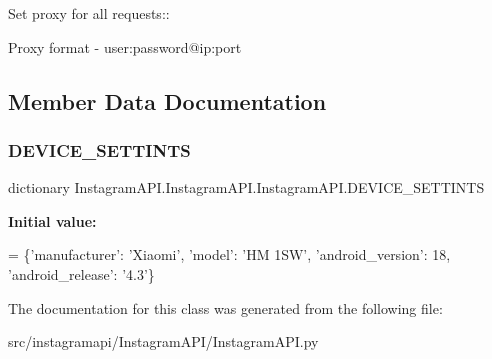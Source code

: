 \begin{DoxyVerb}Set proxy for all requests::

Proxy format - user:password@ip:port
\end{DoxyVerb}
 

\subsection{Member Data Documentation}
\mbox{\label{class_instagram_a_p_i_1_1_instagram_a_p_i_1_1_instagram_a_p_i_a79357d88350a65804fc06e2f5aed1765}} 
\subsubsection{\texorpdfstring{D\+E\+V\+I\+C\+E\+\_\+\+S\+E\+T\+T\+I\+N\+TS}{DEVICE\_SETTINTS}}
{\footnotesize\ttfamily dictionary Instagram\+A\+P\+I.\+Instagram\+A\+P\+I.\+Instagram\+A\+P\+I.\+D\+E\+V\+I\+C\+E\+\_\+\+S\+E\+T\+T\+I\+N\+TS\hspace{0.3cm}{\ttfamily [static]}}

{\bfseries Initial value\+:}
\begin{DoxyCode}
=  \{\textcolor{stringliteral}{'manufacturer'}: \textcolor{stringliteral}{'Xiaomi'},
                       \textcolor{stringliteral}{'model'}: \textcolor{stringliteral}{'HM 1SW'},
                       \textcolor{stringliteral}{'android\_version'}: 18,
                       \textcolor{stringliteral}{'android\_release'}: \textcolor{stringliteral}{'4.3'}\}
\end{DoxyCode}


The documentation for this class was generated from the following file\+:\begin{DoxyCompactItemize}
\item 
src/instagramapi/\+Instagram\+A\+P\+I/Instagram\+A\+P\+I.\+py\end{DoxyCompactItemize}
